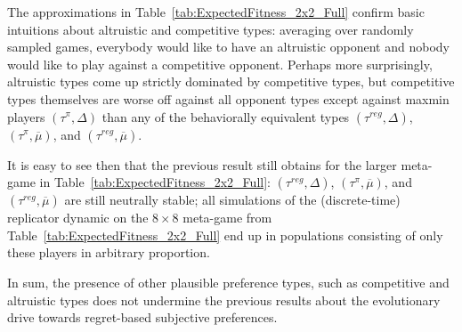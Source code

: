 \documentclass[fleqn,reqno,11pt]{article}
\newcommand{\myalert}[1]{\textcolor{red}{#1}}
\begin{document}
The approximations in Table~\ref{tab:ExpectedFitness_2x2_Full} confirm basic intuitions about
altruistic and competitive types: averaging over randomly sampled games, everybody would like
to have an altruistic opponent and nobody would like to play against a competitive
opponent. Perhaps more surprisingly, altruistic types come up strictly dominated by competitive
types, but competitive types themselves are worse off against all opponent types except against
maxmin players $(\tau^{\pi}, \Delta)$ than any of the behaviorally equivalent types
$(\tau^{reg}, \Delta)$, $(\tau^{\pi}, \overline{\mu})$, and
$(\tau^{reg}, \overline{\mu})$. 
\iffalse
This is a noteworthy results in the light of the fact that
evolving altruistic preferences have been shown to support cooperative behavior in a single
stage game \myalert{[CITE]}. In contrast,
averaging over payoffs in multiple stage games, like we do here, makes altruistic preferences
prime victims of evolutionary eradication.
\fi
It is easy to see then that the previous result still obtains for the larger meta-game in
Table~\ref{tab:ExpectedFitness_2x2_Full}: $(\tau^{reg}, \Delta)$,
$(\tau^{\pi}, \overline{\mu})$, and $(\tau^{reg}, \overline{\mu})$ are still neutrally stable;
all simulations of the (discrete-time) replicator dynamic on the $8 \times 8$ meta-game from
Table~\ref{tab:ExpectedFitness_2x2_Full} end up in populations consisting of only these players
in arbitrary proportion.

\iffalse

The following proposition (partially) confirms this result.\todo{rephrase to acknowledge all
  epistemic types?}

\begin{proposition} \label{proposition2}

Fix $\Lambda = \lbrace (\tau^{\pi}, \Delta), (\tau^{reg}, \Delta), (\tau^{alt}, \Delta), (\tau^{com}, \Delta) \rbrace$ and $\mathcal{G}$ the class of symmetric $2 \times 2$ games with payoffs sampled from a finite, or compact and convex, set of i.i.d. values. Then, $(\tau^{reg}, \Delta)$ is the only evolutionarily stable player in the population.

\end{proposition}

\begin{proof}
See Appendix.\todo{is this there already?}
\end{proof}

\fi


In sum, the presence of other plausible preference types, such as competitive and altruistic
types does not undermine the previous results about the evolutionary drive towards regret-based
subjective preferences.
\end{document}
